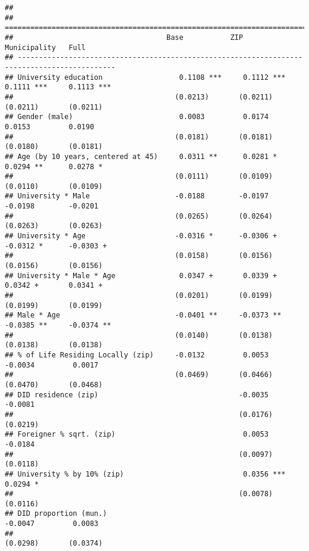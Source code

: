 \documentclass[
]{article}
\begin{document}
\begin{verbatim}
## 
## =============================================================================================
##                                    Base           ZIP            Municipality   Full         
## ---------------------------------------------------------------------------------------------
## University education                  0.1108 ***     0.1112 ***     0.1111 ***     0.1113 ***
##                                      (0.0213)       (0.0211)       (0.0211)       (0.0211)   
## Gender (male)                         0.0083         0.0174         0.0153         0.0190    
##                                      (0.0181)       (0.0181)       (0.0180)       (0.0181)   
## Age (by 10 years, centered at 45)     0.0311 **      0.0281 *       0.0294 **      0.0278 *  
##                                      (0.0111)       (0.0109)       (0.0110)       (0.0109)   
## University * Male                    -0.0188        -0.0197        -0.0198        -0.0201    
##                                      (0.0265)       (0.0264)       (0.0263)       (0.0263)   
## University * Age                     -0.0316 *      -0.0306 +      -0.0312 *      -0.0303 +  
##                                      (0.0158)       (0.0156)       (0.0156)       (0.0156)   
## University * Male * Age               0.0347 +       0.0339 +       0.0342 +       0.0341 +  
##                                      (0.0201)       (0.0199)       (0.0199)       (0.0199)   
## Male * Age                           -0.0401 **     -0.0373 **     -0.0385 **     -0.0374 ** 
##                                      (0.0140)       (0.0138)       (0.0138)       (0.0138)   
## % of Life Residing Locally (zip)     -0.0132         0.0053        -0.0034         0.0017    
##                                      (0.0469)       (0.0466)       (0.0470)       (0.0468)   
## DID residence (zip)                                 -0.0035                       -0.0081    
##                                                     (0.0176)                      (0.0219)   
## Foreigner % sqrt. (zip)                              0.0053                       -0.0184    
##                                                     (0.0097)                      (0.0118)   
## University % by 10% (zip)                            0.0356 ***                    0.0294 *  
##                                                     (0.0078)                      (0.0116)   
## DID proportion (mun.)                                              -0.0047         0.0083    
##                                                                    (0.0298)       (0.0374)   

\end{verbatim}
\end{document}
